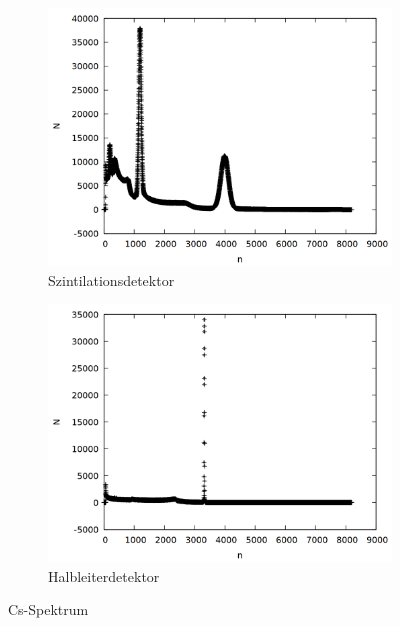 \begin{figure}[h]
  \centering
  \begin{subfigure}[h]{0.5\textwidth}
    \centering
    \includegraphics[width=\textwidth]{data/si_cs_raw.png}
    \caption{Szintilationsdetektor}
  \end{subfigure}%
  \begin{subfigure}[h]{0.5\textwidth}
    \centering
    \includegraphics[width=\textwidth]{data/ge_cs_raw.png}
    \caption{Halbleiterdetektor}
  \end{subfigure}
  \caption{Cs-Spektrum}
\end{figure} 

